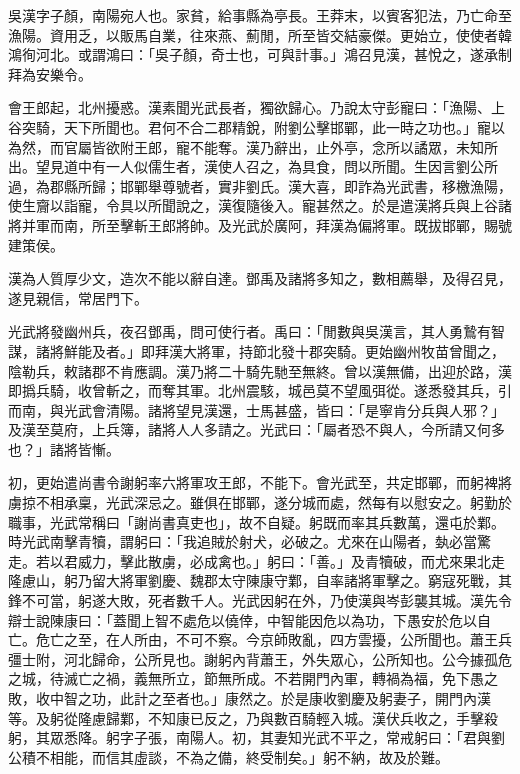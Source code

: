 
\begin{pinyinscope}
吳漢字子顏，南陽宛人也。家貧，給事縣為亭長。王莽末，以賓客犯法，乃亡命至漁陽。資用乏，以販馬自業，往來燕、薊閒，所至皆交結豪傑。更始立，使使者韓鴻徇河北。或謂鴻曰：「吳子顏，奇士也，可與計事。」鴻召見漢，甚悅之，遂承制拜為安樂令。

會王郎起，北州擾惑。漢素聞光武長者，獨欲歸心。乃說太守彭寵曰：「漁陽、上谷突騎，天下所聞也。君何不合二郡精銳，附劉公擊邯鄲，此一時之功也。」寵以為然，而官屬皆欲附王郎，寵不能奪。漢乃辭出，止外亭，念所以譎眾，未知所出。望見道中有一人似儒生者，漢使人召之，為具食，問以所聞。生因言劉公所過，為郡縣所歸；邯鄲舉尊號者，實非劉氏。漢大喜，即詐為光武書，移檄漁陽，使生齎以詣寵，令具以所聞說之，漢復隨後入。寵甚然之。於是遣漢將兵與上谷諸將并軍而南，所至擊斬王郎將帥。及光武於廣阿，拜漢為偏將軍。既拔邯鄲，賜號建策侯。

漢為人質厚少文，造次不能以辭自達。鄧禹及諸將多知之，數相薦舉，及得召見，遂見親信，常居門下。

光武將發幽州兵，夜召鄧禹，問可使行者。禹曰：「閒數與吳漢言，其人勇鷙有智謀，諸將鮮能及者。」即拜漢大將軍，持節北發十郡突騎。更始幽州牧苗曾聞之，陰勒兵，敕諸郡不肯應調。漢乃將二十騎先馳至無終。曾以漢無備，出迎於路，漢即撝兵騎，收曾斬之，而奪其軍。北州震駭，城邑莫不望風弭從。遂悉發其兵，引而南，與光武會清陽。諸將望見漢還，士馬甚盛，皆曰：「是寧肯分兵與人邪？」及漢至莫府，上兵簿，諸將人人多請之。光武曰：「屬者恐不與人，今所請又何多也？」諸將皆慚。

初，更始遣尚書令謝躬率六將軍攻王郎，不能下。會光武至，共定邯鄲，而躬裨將虜掠不相承稟，光武深忌之。雖俱在邯鄲，遂分城而處，然每有以慰安之。躬勤於職事，光武常稱曰「謝尚書真吏也」，故不自疑。躬既而率其兵數萬，還屯於鄴。時光武南擊青犢，謂躬曰：「我追賊於射犬，必破之。尤來在山陽者，埶必當驚走。若以君威力，擊此散虜，必成禽也。」躬曰：「善。」及青犢破，而尤來果北走隆慮山，躬乃留大將軍劉慶、魏郡太守陳康守鄴，自率諸將軍擊之。窮寇死戰，其鋒不可當，躬遂大敗，死者數千人。光武因躬在外，乃使漢與岑彭襲其城。漢先令辯士說陳康曰：「蓋聞上智不處危以僥倖，中智能因危以為功，下愚安於危以自亡。危亡之至，在人所由，不可不察。今京師敗亂，四方雲擾，公所聞也。蕭王兵彊士附，河北歸命，公所見也。謝躬內背蕭王，外失眾心，公所知也。公今據孤危之城，待滅亡之禍，義無所立，節無所成。不若開門內軍，轉禍為福，免下愚之敗，收中智之功，此計之至者也。」康然之。於是康收劉慶及躬妻子，開門內漢等。及躬從隆慮歸鄴，不知康已反之，乃與數百騎輕入城。漢伏兵收之，手擊殺躬，其眾悉降。躬字子張，南陽人。初，其妻知光武不平之，常戒躬曰：「君與劉公積不相能，而信其虛談，不為之備，終受制矣。」躬不納，故及於難。


\end{pinyinscope}
